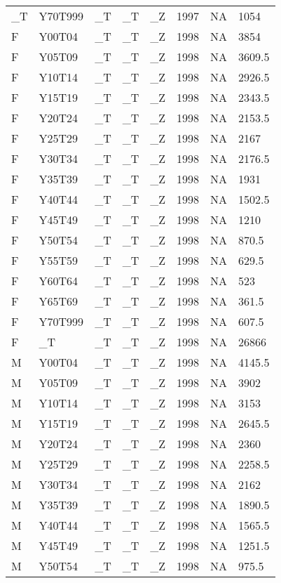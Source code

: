 \begin{longtable}[t]{llllllll}
\_T & Y70T999 & \_T & \_T & \_Z & 1997 & NA & 1054\\
F & Y00T04 & \_T & \_T & \_Z & 1998 & NA & 3854\\
\addlinespace
F & Y05T09 & \_T & \_T & \_Z & 1998 & NA & 3609.5\\
F & Y10T14 & \_T & \_T & \_Z & 1998 & NA & 2926.5\\
F & Y15T19 & \_T & \_T & \_Z & 1998 & NA & 2343.5\\
F & Y20T24 & \_T & \_T & \_Z & 1998 & NA & 2153.5\\
F & Y25T29 & \_T & \_T & \_Z & 1998 & NA & 2167\\
\addlinespace
F & Y30T34 & \_T & \_T & \_Z & 1998 & NA & 2176.5\\
F & Y35T39 & \_T & \_T & \_Z & 1998 & NA & 1931\\
F & Y40T44 & \_T & \_T & \_Z & 1998 & NA & 1502.5\\
F & Y45T49 & \_T & \_T & \_Z & 1998 & NA & 1210\\
F & Y50T54 & \_T & \_T & \_Z & 1998 & NA & 870.5\\
\addlinespace
F & Y55T59 & \_T & \_T & \_Z & 1998 & NA & 629.5\\
F & Y60T64 & \_T & \_T & \_Z & 1998 & NA & 523\\
F & Y65T69 & \_T & \_T & \_Z & 1998 & NA & 361.5\\
F & Y70T999 & \_T & \_T & \_Z & 1998 & NA & 607.5\\
F & \_T & \_T & \_T & \_Z & 1998 & NA & 26866\\
\addlinespace
M & Y00T04 & \_T & \_T & \_Z & 1998 & NA & 4145.5\\
M & Y05T09 & \_T & \_T & \_Z & 1998 & NA & 3902\\
M & Y10T14 & \_T & \_T & \_Z & 1998 & NA & 3153\\
M & Y15T19 & \_T & \_T & \_Z & 1998 & NA & 2645.5\\
M & Y20T24 & \_T & \_T & \_Z & 1998 & NA & 2360\\
\addlinespace
M & Y25T29 & \_T & \_T & \_Z & 1998 & NA & 2258.5\\
M & Y30T34 & \_T & \_T & \_Z & 1998 & NA & 2162\\
M & Y35T39 & \_T & \_T & \_Z & 1998 & NA & 1890.5\\
M & Y40T44 & \_T & \_T & \_Z & 1998 & NA & 1565.5\\
M & Y45T49 & \_T & \_T & \_Z & 1998 & NA & 1251.5\\
\addlinespace
M & Y50T54 & \_T & \_T & \_Z & 1998 & NA & 975.5\\

\end{longtable}
